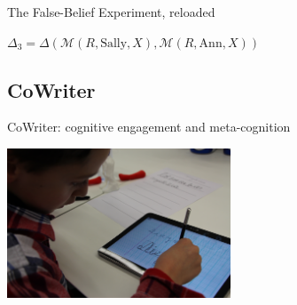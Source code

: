 \documentclass[compress]{beamer}
\newcommand{\Mmodel}[3]{{\mathcal{M}(#1, #2, #3)}}
\begin{document}
{\begin{frame}{The False-Belief Experiment, reloaded}
{        {\centering
            \(\Delta_3= \Delta(\Mmodel{R}{\text{Sally}}{X}, \Mmodel{R}{\text{Ann}}{X})\)

        }

    }
\end{frame}

\subsection{CoWriter}

{
\begin{frame}{CoWriter: cognitive engagement and meta-cognition}

    \begin{flushright}
        \includegraphics[width=0.5\textwidth]{diego-writing}
    \end{flushright}

\end{frame}
}

}
\end{document}
